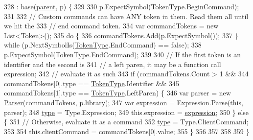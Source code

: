 \begin{DoxyCode}
328                                                                : base(\hyperlink{a00122_af313a82103fcc2ff5a177dbb06b92f7b}{parent}, p) \{
329 
330                 p.ExpectSymbol(TokenType.BeginCommand);
331 
332                 \textcolor{comment}{// Custom commands can have ANY token in them. Read them all until we hit the}
333                 \textcolor{comment}{// end command token.}
334                 var commandTokens = \textcolor{keyword}{new} List<Token>();
335                 \textcolor{keywordflow}{do} \{
336                     commandTokens.Add(p.ExpectSymbol());
337                 \} \textcolor{keywordflow}{while} (p.NextSymbolIs(\hyperlink{a00031_a301aa7c866593a5b625a8fc158bbeace}{TokenType}.EndCommand) == \textcolor{keyword}{false});
338                 p.ExpectSymbol(TokenType.EndCommand);
339 
340                 \textcolor{comment}{// If the first token is an identifier and the second is}
341                 \textcolor{comment}{// a left paren, it may be a function call expression;}
342                 \textcolor{comment}{// evaluate it as such}
343                 \textcolor{keywordflow}{if} (commandTokens.Count > 1 && 
344                     commandTokens[0].type == \hyperlink{a00031_a301aa7c866593a5b625a8fc158bbeace}{TokenType}.Identifier &&
345                     commandTokens[1].type == \hyperlink{a00031_a301aa7c866593a5b625a8fc158bbeace}{TokenType}.LeftParen) \{            
346                     var parser = \textcolor{keyword}{new} \hyperlink{a00123_acd2714b911fb5e7c38f0e07a9dc1af58}{Parser}(commandTokens, p.library);
347                     var \hyperlink{a00063_a4250d192d5b58e2404a14c68eb616f16}{expression} = Expression.Parse(\textcolor{keyword}{this}, parser);
348                     \hyperlink{a00063_a5ef3bc96812be224d91548bfcdfd4b92}{type} = Type.Expression;
349                     this.expression = \hyperlink{a00063_a4250d192d5b58e2404a14c68eb616f16}{expression};
350                 \} \textcolor{keywordflow}{else} \{
351                     \textcolor{comment}{// Otherwise, evaluate it as a command}
352                     \hyperlink{a00063_a5ef3bc96812be224d91548bfcdfd4b92}{type} = Type.ClientCommand;
353 
354                     this.clientCommand = commandTokens[0].value;
355                 \}
356 
357 
358 
359             \}
\end{DoxyCode}


